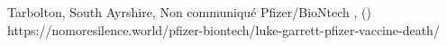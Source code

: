           {Tarbolton, South Ayrshire, }
          {Non communiqué}
          {Pfizer/BioNtech}
          {}
          {
            ,
             ()
          }
          {https://nomoresilence.world/pfizer-biontech/luke-garrett-pfizer-vaccine-death/}
